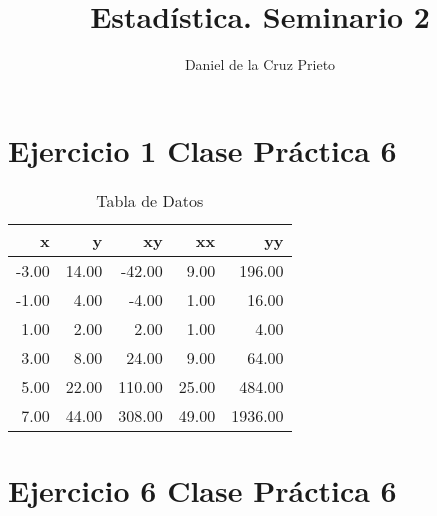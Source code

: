 \documentclass{article}
\begin{document}
	\title{Estad\'istica.  Seminario 2}
	\author{Daniel de la Cruz Prieto} 
	\maketitle
	
	\section*{Ejercicio 1 Clase Pr\'actica 6 }
	
	\begin{table}[ht]
		\centering
		\caption{Tabla de Datos}
		\begin{tabular}{rrrrr}
			\hline
			x & y & xy & xx & yy \\ 
			\hline
			-3.00 & 14.00 & -42.00 & 9.00 & 196.00 \\ 
			-1.00 & 4.00 & -4.00 & 1.00 & 16.00 \\ 
			1.00 & 2.00 & 2.00 & 1.00 & 4.00 \\ 
			3.00 & 8.00 & 24.00 & 9.00 & 64.00 \\ 
			5.00 & 22.00 & 110.00 & 25.00 & 484.00 \\ 
			\hline
			7.00 & 44.00 & 308.00 & 49.00 & 1936.00 \\ 
			\hline
		\end{tabular}
	\end{table}
	
	\section*{Ejercicio 6 Clase Pr\'actica 6 }
\end{document}
